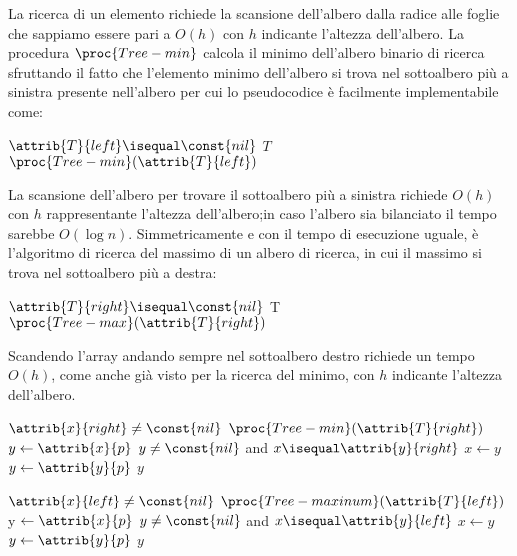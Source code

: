 La ricerca di un elemento richiede la scansione dell'albero dalla radice alle foglie
che sappiamo essere pari a $O(h)$ con $h$ indicante l'altezza dell'albero.
La procedura $\proc{Tree-min}$ calcola il minimo dell'albero binario di ricerca sfruttando
il fatto che l'elemento minimo dell'albero si trova nel sottoalbero più a sinistra presente nell'albero
per cui lo pseudocodice è facilmente implementabile come:
\begin{codebox}
\li \If $\attrib{T}{left} \isequal \const{nil}$
    \Then
\li                       \Return $T$
\li \Else \Return $\proc{Tree-min}(\attrib{T}{left})$
\end{codebox}

La scansione dell'albero per trovare il sottoalbero più a sinistra richiede
$O(h)$ con $h$ rappresentante l'altezza  dell'albero;in caso l'albero sia bilanciato il tempo sarebbe $O(\log n)$.
Simmetricamente e con il tempo di esecuzione uguale, è l'algoritmo di ricerca del massimo di un
albero di ricerca, in cui il massimo si trova nel sottoalbero più a destra:
\begin{codebox}
\li \If $\attrib{T}{right} \isequal \const{nil}$
    \Then
\li                        \Return T
\li \Else \Return $\proc{Tree-max}(\attrib{T}{right})$
\end{codebox}
Scandendo l'array andando sempre nel sottoalbero destro richiede un tempo $O(h)$,
come anche già visto per la ricerca del minimo, con $h$ indicante l'altezza dell'albero.

\begin{codebox}
\li \If $\attrib{x}{right} \neq \const{nil}$
    \Then
\li             \Return $\proc{Tree-min}(\attrib{T}{right})$
\li $y \gets \attrib{x}{p}$
\li \While $y \neq \const{nil}$ and $x \isequal \attrib{y}{right}$
    \Do
\li                $x \gets y$
\li                $y \gets \attrib{y}{p}$
    \End
\Return $y$
\end{codebox}

\begin{codebox}
\li \If $\attrib{x}{left} \neq \const{nil}$
    \Then
\li                     \Return $\proc{Tree-maxinum}(\attrib{T}{left})$
    \End
\li y $\gets \attrib{x}{p}$
\li \While $y \neq \const{nil}$ and $x \isequal \attrib{y}{left}$
    \Do
\li                $x \gets y$
\li                $y \gets \attrib{y}{p}$
    \End
\li \Return $y$
\end{codebox}


